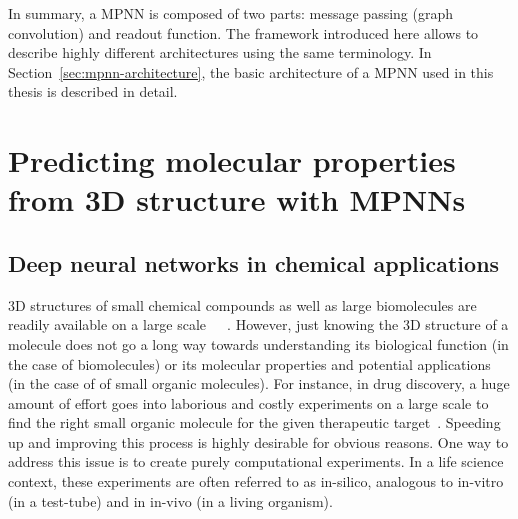 In summary, a MPNN is composed of two parts: message passing (graph convolution) and readout function. The framework introduced here allows to describe highly different architectures using the same terminology. In Section~\ref{sec:mpnn-architecture}, the basic architecture of a MPNN used in this thesis is described in detail.

\section{Predicting molecular properties from 3D structure with MPNNs}
\label{3d-molecules-for-gcnns}

\subsection{Deep neural networks in chemical applications}

3D structures of small chemical compounds as well as large biomolecules are readily available on a large scale~\cite{Ruddigkeit2012}~\cite{Chen2019}~\cite{Ramakrishnan2014}.
However, just knowing the 3D structure of a molecule does not go a long way towards understanding its biological function (in the case of biomolecules) or its molecular properties and potential applications (in the case of of small organic molecules). For instance, in drug discovery, a huge amount of effort goes into laborious and costly experiments on a large scale to find the right small organic molecule for the given therapeutic target~\cite{Fda-drug-discovery}. Speeding up and improving this process is highly desirable for obvious reasons. 
One way to address this issue is to create purely computational experiments. In a life science context, these experiments are often referred to as in-silico, analogous to in-vitro (in a test-tube) and in in-vivo (in a living organism).




